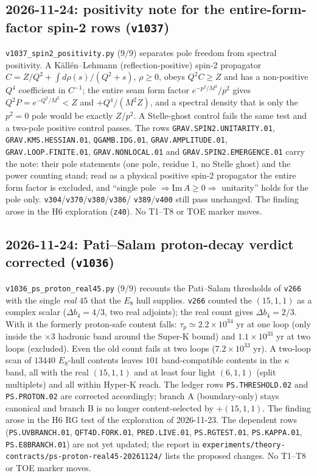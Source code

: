 \subsection*{2026-11-24: positivity note for the entire-form-factor spin-2 rows (\texttt{v1037})}
\texttt{v1037\_spin2\_positivity.py} ($9/9$) separates pole freedom from
spectral positivity. A K\"all\'en--Lehmann (reflection-positive) spin-2
propagator $C=Z/Q^2+\int d\rho(s)/(Q^2+s)$, $\rho\ge0$, obeys $Q^2C\ge Z$ and
has a non-positive $Q^4$ coefficient in $C^{-1}$; the entire seam form factor
$e^{-p^2/M^2}/p^2$ gives $Q^2P=e^{-Q^2/M^2}<Z$ and $+Q^4/(M^2Z)$, and a spectral
density that is only the $p^2=0$ pole would be exactly $Z/p^2$. A Stelle-ghost
control fails the same test and a two-pole positive control passes. The rows
\texttt{GRAV.SPIN2.UNITARITY.01}, \texttt{GRAV.KMS.HESSIAN.01},
\texttt{QGAMB.IDG.01}, \texttt{GRAV.AMPLITUDE.01}, \texttt{GRAV.LOOP.FINITE.01},
\texttt{GRAV.NONLOCAL.01} and \texttt{GRAV.SPIN2.EMERGENCE.01} carry the note: their
pole statements (one pole, residue $1$, no Stelle ghost) and the power counting
stand; read as a physical positive spin-2 propagator the entire form factor is
excluded, and ``single pole $\Rightarrow\mathrm{Im}\,A\ge0\Rightarrow$ unitarity''
holds for the pole only. \texttt{v304}/\texttt{v370}/\texttt{v380}/\texttt{v386}/%
\texttt{v389}/\texttt{v400} still pass unchanged. The finding arose in the H6
exploration (\texttt{z40}). No T1--T8 or TOE marker moves.

\subsection*{2026-11-24: Pati--Salam proton-decay verdict corrected (\texttt{v1036})}
\texttt{v1036\_ps\_proton\_real45.py} ($9/9$) recounts the Pati--Salam
thresholds of \texttt{v266} with the single \emph{real} $45$ that the
$E_8$ hull supplies. \texttt{v266} counted the $(15,1,1)$ as a complex
scalar ($\Delta b_4=4/3$, two real adjoints); the real count gives
$\Delta b_4=2/3$. With it the formerly proton-safe content falls:
$\tau_p\simeq2.2\times10^{34}$ yr at one loop (only inside the $\times3$
hadronic band around the Super-K bound) and $1.1\times10^{33}$ yr at two
loops (excluded). Even the old count fails at two loops
($7.2\times10^{33}$ yr). A two-loop scan of $13440$ $E_8$-hull contents
leaves $101$ band-compatible contents in the $\kappa$ band, all with the real
$(15,1,1)$ and at least four light $(6,1,1)$ (split multiplets) and all
within Hyper-K reach. The ledger rows \texttt{PS.THRESHOLD.02} and
\texttt{PS.PROTON.02} are corrected accordingly; branch A (boundary-only)
stays canonical and branch B is no longer content-selected by $+(15,1,1)$.
The finding arose in the H6 RG test of the exploration of 2026-11-23. The
dependent rows (\texttt{PS.UVBRANCH.01}, \texttt{QFT4D.FORK.01},
\texttt{PRED.LIVE.01}, \texttt{PS.RGTEST.01}, \texttt{PS.KAPPA.01},
\texttt{PS.E8BRANCH.01}) are not yet updated; the report in
\texttt{experiments/theory-contracts/ps-proton-real45-20261124/} lists the
proposed changes. No T1--T8 or TOE marker moves.

